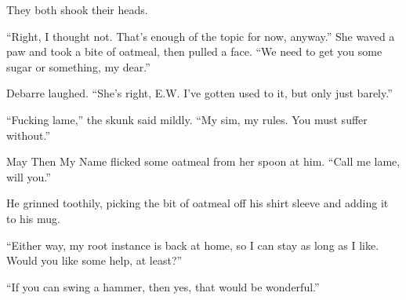 They both shook their heads.

``Right, I thought not. That's enough of the topic for now, anyway.'' She waved a paw and took a bite of oatmeal, then pulled a face. ``We need to get you some sugar or something, my dear.''

Debarre laughed. ``She's right, E.W. I've gotten used to it, but only just barely.''

``Fucking lame,'' the skunk said mildly. ``My sim, my rules. You must suffer without.''

May Then My Name flicked some oatmeal from her spoon at him. ``Call me lame, will you.''

He grinned toothily, picking the bit of oatmeal off his shirt sleeve and adding it to his mug.

``Either way, my root instance is back at home, so I can stay as long as I like. Would you like some help, at least?''

``If you can swing a hammer, then yes, that would be wonderful.''
